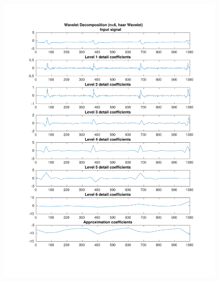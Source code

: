 \documentclass[11pt,a4paper]{article}
\begin{document}
\begin{figure}[H]
\centering
\begin{minipage}{0.48\textwidth}
	\centering
	\includegraphics[width=\textwidth]{fig/118l1_dwt1.pdf}
	

\end{minipage}
\end{figure}
\end{document}
